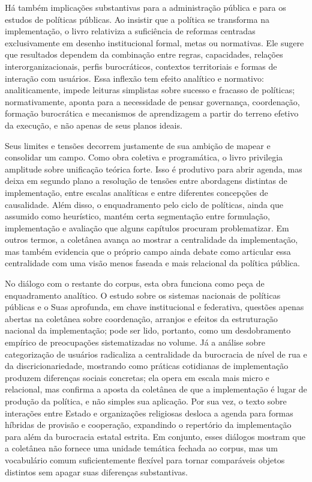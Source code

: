 \documentclass[12pt,a4paper]{article}
\begin{document}
Há também implicações substantivas para a administração pública e para os estudos de políticas públicas. Ao insistir que a política se transforma na implementação, o livro relativiza a suficiência de reformas centradas exclusivamente em desenho institucional formal, metas ou normativas. Ele sugere que resultados dependem da combinação entre regras, capacidades, relações interorganizacionais, perfis burocráticos, contextos territoriais e formas de interação com usuários. Essa inflexão tem efeito analítico e normativo: analiticamente, impede leituras simplistas sobre sucesso e fracasso de políticas; normativamente, aponta para a necessidade de pensar governança, coordenação, formação burocrática e mecanismos de aprendizagem a partir do terreno efetivo da execução, e não apenas de seus planos ideais. \parencite{lotta2019_teorias_analises}

Seus limites e tensões decorrem justamente de sua ambição de mapear e consolidar um campo. Como obra coletiva e programática, o livro privilegia amplitude sobre unificação teórica forte. Isso é produtivo para abrir agenda, mas deixa em segundo plano a resolução de tensões entre abordagens distintas de implementação, entre escalas analíticas e entre diferentes concepções de causalidade. Além disso, o enquadramento pelo ciclo de políticas, ainda que assumido como heurístico, mantém certa segmentação entre formulação, implementação e avaliação que alguns capítulos procuram problematizar. Em outros termos, a coletânea avança ao mostrar a centralidade da implementação, mas também evidencia que o próprio campo ainda debate como articular essa centralidade com uma visão menos faseada e mais relacional da política pública. \parencite{lotta2019_teorias_analises}

No diálogo com o restante do corpus, esta obra funciona como peça de enquadramento analítico. O estudo sobre os sistemas nacionais de políticas públicas e o Suas aprofunda, em chave institucional e federativa, questões apenas abertas na coletânea sobre coordenação, arranjos e efeitos da estruturação nacional da implementação; pode ser lido, portanto, como um desdobramento empírico de preocupações sistematizadas no volume. \parencite{bichir2020_sistemas_nacionais} Já a análise sobre categorização de usuários radicaliza a centralidade da burocracia de nível de rua e da discricionariedade, mostrando como práticas cotidianas de implementação produzem diferenças sociais concretas; ela opera em escala mais micro e relacional, mas confirma a aposta da coletânea de que a implementação é lugar de produção da política, e não simples sua aplicação. \parencite{lotta2020_categorizando_usuarios} Por sua vez, o texto sobre interações entre Estado e organizações religiosas desloca a agenda para formas híbridas de provisão e cooperação, expandindo o repertório da implementação para além da burocracia estatal estrita. Em conjunto, esses diálogos mostram que a coletânea não fornece uma unidade temática fechada ao corpus, mas um vocabulário comum suficientemente flexível para tornar comparáveis objetos distintos sem apagar suas diferenças substantivas. \parencite{lotta2023_jesus_speaks}
\end{document}
